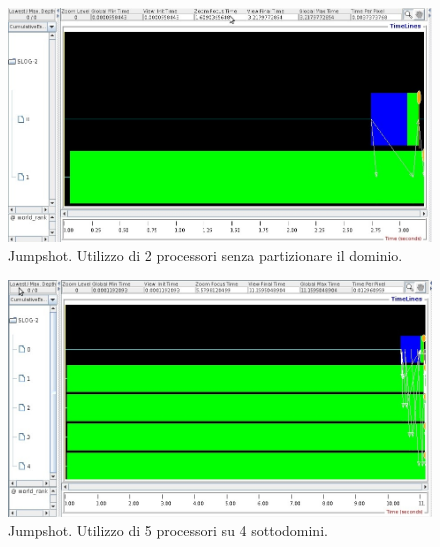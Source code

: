 \begin{figure}[htbp]
\centering
\includegraphics[width=\textwidth]{Immagini_relazione/2pCiascuno1.jpeg}
\caption{Jumpshot. Utilizzo di 2 processori senza partizionare il dominio.}
\label{fig:nopartiz}
\end{figure}

\begin{figure}[htbp]
\centering
\includegraphics[width=\textwidth]{Immagini_relazione/5pCiascuno4.jpeg}
\caption{Jumpshot. Utilizzo di 5 processori su 4 sottodomini.}
\label{fig:sottodom}
\end{figure}


%

